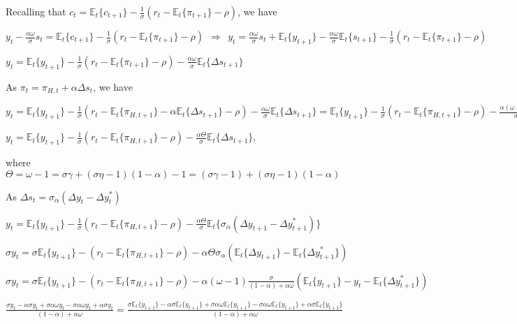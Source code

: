 \documentclass[
]{article}
\begin{document}
\vspace{8pt}

Recalling that
\(\displaystyle c_t=\mathbb{E}_t\{c_{t+1}\}-\frac{1}{\sigma}(r_t-\mathbb{E}_t\{\pi_{t+1}\}-\rho)\),
we have

\(\displaystyle y_t - \frac{\alpha \omega}{\sigma}s_t = \mathbb{E}_t\{c_{t+1}\}-\frac{1}{\sigma}(r_t-\mathbb{E}_t\{\pi_{t+1}\}-\rho) \ \ \Rightarrow \ \ y_t = \frac{\alpha \omega}{\sigma}s_t + \mathbb{E}_t\{y_{t+1}\} - \frac{\alpha \omega}{\sigma}\mathbb{E}_t\{s_{t+1}\} -\frac{1}{\sigma}(r_t-\mathbb{E}_t\{\pi_{t+1}\}-\rho)\)

\(\displaystyle y_t = \mathbb{E}_t\{y_{t+1}\} -\frac{1}{\sigma}(r_t-\mathbb{E}_t\{\pi_{t+1}\}-\rho)- \frac{\alpha \omega}{\sigma}\mathbb{E}_t\{\Delta s_{t+1}\}\)

As \(\pi_t = \pi_{H,t}+\alpha\Delta s_t\), we have

\(\displaystyle y_t = \mathbb{E}_t\{y_{t+1}\} -\frac{1}{\sigma}(r_t-\mathbb{E}_t\{\pi_{H,t+1}\}-\alpha \mathbb{E}_t\{\Delta s_{t+1} \} -\rho)- \frac{\alpha \omega}{\sigma}\mathbb{E}_t\{\Delta s_{t+1}\} = \mathbb{E}_t\{y_{t+1}\} -\frac{1}{\sigma}(r_t-\mathbb{E}_t\{\pi_{H,t+1}\} -\rho)- \frac{\alpha (\omega-1)}{\sigma}\mathbb{E}_t\{\Delta s_{t+1}\}\)

\(\displaystyle y_t = \mathbb{E}_t\{y_{t+1}\} -\frac{1}{\sigma}(r_t-\mathbb{E}_t\{\pi_{H,t+1}\} -\rho)- \frac{\alpha \Theta}{\sigma}\mathbb{E}_t\{\Delta s_{t+1}\}\),

where
\(\Theta = \omega-1 = \sigma \gamma + (\sigma \eta - 1)(1-\alpha)-1=(\sigma \gamma-1) + (\sigma \eta - 1)(1-\alpha)\)

As \(\Delta s_t= \sigma_\alpha (\Delta y_t - \Delta y_t^*)\)

\(\displaystyle y_t = \mathbb{E}_t\{y_{t+1}\} -\frac{1}{\sigma}(r_t-\mathbb{E}_t\{\pi_{H,t+1}\} -\rho)- \frac{\alpha \Theta}{\sigma}\mathbb{E}_t\{\sigma_\alpha (\Delta y_{t+1} - \Delta y_{t+1}^*)\}\)

\(\displaystyle \sigma y_t = \sigma \mathbb{E}_t\{y_{t+1}\} -(r_t-\mathbb{E}_t\{\pi_{H,t+1}\} -\rho)- \alpha \Theta \sigma_\alpha (\mathbb{E}_t\{ \Delta y_{t+1} \} - \mathbb{E}_t\{\Delta y_{t+1}^*\})\)

\(\displaystyle \sigma y_t=\sigma \mathbb{E}_t\{y_{t+1}\} -(r_t-\mathbb{E}_t\{\pi_{H,t+1}\} -\rho)- \alpha (\omega-1) \frac{\sigma}{(1-\alpha)+\alpha \omega} (\mathbb{E}_t\{ y_{t+1} \} -y_t - \mathbb{E}_t\{\Delta y_{t+1}^*\})\)

\(\displaystyle \frac{\sigma y_t -\alpha \sigma y_t + \sigma \alpha \omega y_t -\sigma \alpha \omega y_t + \alpha \sigma y_t}{(1-\alpha)+\alpha \omega}= \frac{\sigma \mathbb{E}_t\{y_{t+1}\} -\alpha \sigma \mathbb{E}_t\{y_{t+1}\} + \sigma \alpha \omega \mathbb{E}_t\{y_{t+1}\} -\sigma \alpha \omega \mathbb{E}_t\{y_{t+1}\} + \alpha \sigma \mathbb{E}_t\{y_{t+1}\}}{(1-\alpha)+\alpha \omega}\)
\end{document}
